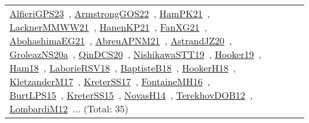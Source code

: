 {\begin{longtable}{lp{3cm}>{\raggedright\arraybackslash}p{6cm}>{\raggedright\arraybackslash}p{6cm}>{\raggedright\arraybackslash}p{8cm}}
\href{works/AlfieriGPS23.pdf}{AlfieriGPS23}~\cite{AlfieriGPS23}, \href{works/ArmstrongGOS22.pdf}{ArmstrongGOS22}~\cite{ArmstrongGOS22}, \href{works/HamPK21.pdf}{HamPK21}~\cite{HamPK21}, \href{works/LacknerMMWW21.pdf}{LacknerMMWW21}~\cite{LacknerMMWW21}, \href{works/HanenKP21.pdf}{HanenKP21}~\cite{HanenKP21}, \href{works/FanXG21.pdf}{FanXG21}~\cite{FanXG21}, \href{works/AbohashimaEG21.pdf}{AbohashimaEG21}~\cite{AbohashimaEG21}, \href{works/AbreuAPNM21.pdf}{AbreuAPNM21}~\cite{AbreuAPNM21}, \href{works/AstrandJZ20.pdf}{AstrandJZ20}~\cite{AstrandJZ20}, \href{works/GroleazNS20a.pdf}{GroleazNS20a}~\cite{GroleazNS20a}, \href{works/QinDCS20.pdf}{QinDCS20}~\cite{QinDCS20}, \href{works/NishikawaSTT19.pdf}{NishikawaSTT19}~\cite{NishikawaSTT19}, \href{works/Hooker19.pdf}{Hooker19}~\cite{Hooker19}, \href{works/Ham18.pdf}{Ham18}~\cite{Ham18}, \href{works/LaborieRSV18.pdf}{LaborieRSV18}~\cite{LaborieRSV18}, \href{works/BaptisteB18.pdf}{BaptisteB18}~\cite{BaptisteB18}, \href{works/HookerH18.pdf}{HookerH18}~\cite{HookerH18}, \href{works/KletzanderM17.pdf}{KletzanderM17}~\cite{KletzanderM17}, \href{works/KreterSS17.pdf}{KreterSS17}~\cite{KreterSS17}, \href{works/FontaineMH16.pdf}{FontaineMH16}~\cite{FontaineMH16}, \href{works/BurtLPS15.pdf}{BurtLPS15}~\cite{BurtLPS15}, \href{works/KreterSS15.pdf}{KreterSS15}~\cite{KreterSS15}, \href{works/NovasH14.pdf}{NovasH14}~\cite{NovasH14}, \href{works/TerekhovDOB12.pdf}{TerekhovDOB12}~\cite{TerekhovDOB12}, \href{works/LombardiM12.pdf}{LombardiM12}~\cite{LombardiM12}... (Total: 35)\\

\end{longtable}}
